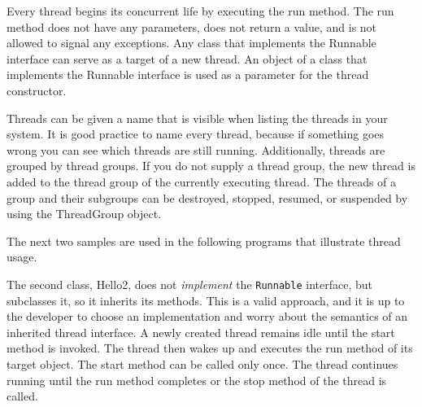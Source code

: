 {Every thread begins its concurrent life by executing the run method. The run method does not have any parameters, does not return a value, and is not allowed to signal any exceptions.
Any class that implements the Runnable interface can serve as a target of a new thread. An object of a class that implements the Runnable interface is used as a parameter for the thread constructor.

Threads can be given a name that is visible when listing the threads in your system. It is good practice to name every thread, because if something goes wrong you can see which threads are still running.
Additionally, threads are grouped by thread groups. If you do not
supply a thread group, the new thread is added to the thread group of
the currently executing thread. The threads of a group and their
subgroups can be destroyed, stopped, resumed, or suspended by using
the ThreadGroup object. 

The next two samples are used in the following programs that
illustrate thread usage.
 
 
The second class, Hello2, does not \emph{implement} the
\texttt{Runnable} interface, but subclasses it, so it inherits its
methods. This is a valid approach, and it is up to the developer to
choose an implementation and worry about the semantics of an inherited
thread interface.
A newly created thread remains idle until the start method is invoked. The thread then wakes up and executes the run method of its target object. The start method can be called only once. The thread continues running until the run method completes or the stop method of the thread is called.




}
